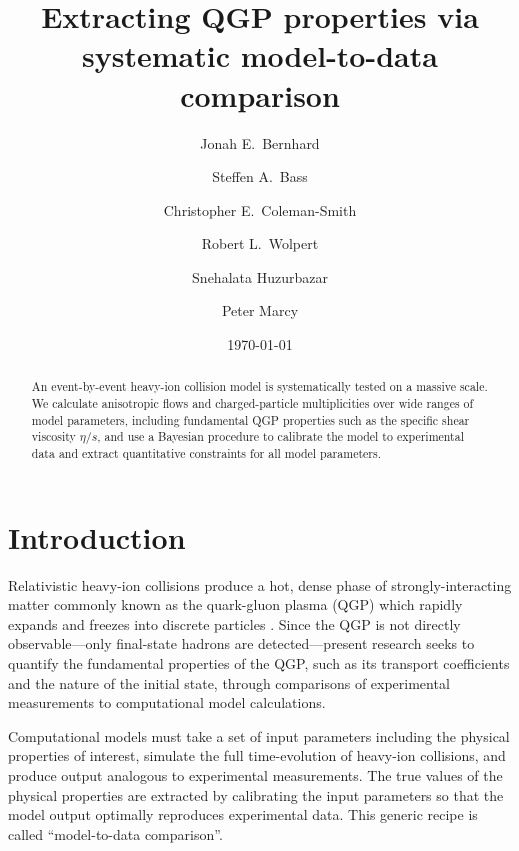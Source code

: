 \documentclass[aps,prc,reprint,amsmath]{revtex4-1}
\begin{document}
\title{Extracting QGP properties via systematic model-to-data comparison}

\author{Jonah E.\ Bernhard}
\author{Steffen A.\ Bass}
\author{Christopher E.\ Coleman-Smith}
\author{Robert L.\ Wolpert}

\author{Snehalata Huzurbazar}

\author{Peter Marcy}


\date{\today}

\begin{abstract}
  An event-by-event heavy-ion collision model is systematically tested on a massive scale.
  We calculate anisotropic flows and charged-particle multiplicities over wide ranges of model parameters, including fundamental QGP properties such as the specific shear viscosity $\eta/s$, and use a Bayesian procedure to calibrate the model to experimental data and extract quantitative constraints for all model parameters.
\end{abstract}

\maketitle


\section{Introduction}

Relativistic heavy-ion collisions produce a hot, dense phase of strongly-interacting matter commonly known as the quark-gluon plasma (QGP) which rapidly expands and freezes into discrete particles \cite{Arsene:2004fa,Adcox:2004mh,Back:2004je,Adams:2005dq,Gyulassy:2004zy,Muller:2006ee,Muller:2012zq}.
Since the QGP is not directly observable---only final-state hadrons are detected---present research seeks to quantify the fundamental properties of the QGP, such as its transport coefficients and the nature of the initial state, through comparisons of experimental measurements to computational model calculations.

Computational models must take a set of input parameters including the physical properties of interest, simulate the full time-evolution of heavy-ion collisions, and produce output analogous to experimental measurements.
The true values of the physical properties are extracted by calibrating the input parameters so that the model output optimally reproduces experimental data.
This generic recipe is called ``model-to-data comparison''.
\end{document}

